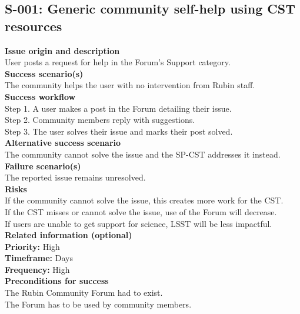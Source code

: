 \subsection{S-001: Generic community self-help using CST resources}

\textbf{Issue origin and description} \\
User posts a request for help in the Forum's Support category. \\

\textbf{Success scenario(s)} \\
The community helps the user with no intervention from Rubin staff. \\

\textbf{Success workflow} \\
Step 1. A user makes a post in the Forum detailing their issue. \\
Step 2. Community members reply with suggestions. \\
Step 3. The user solves their issue and marks their post solved. \\

\textbf{Alternative success scenario} \\
The community cannot solve the issue and the SP-CST addresses it instead. \\

\textbf{Failure scenario(s)} \\
The reported issue remains unresolved. \\

\textbf{Risks} \\
If the community cannot solve the issue, this creates more work for the CST. \\
If the CST misses or cannot solve the issue, use of the Forum will decrease. \\
If users are unable to get support for science, LSST will be less impactful. \\

\textbf{Related information (optional)} \\
\textbf{Priority:} High \\
\textbf{Timeframe:} Days \\
\textbf{Frequency:} High \\

\textbf{Preconditions for success} \\
The Rubin Community Forum had to exist. \\
The Forum has to be used by community members. \\
